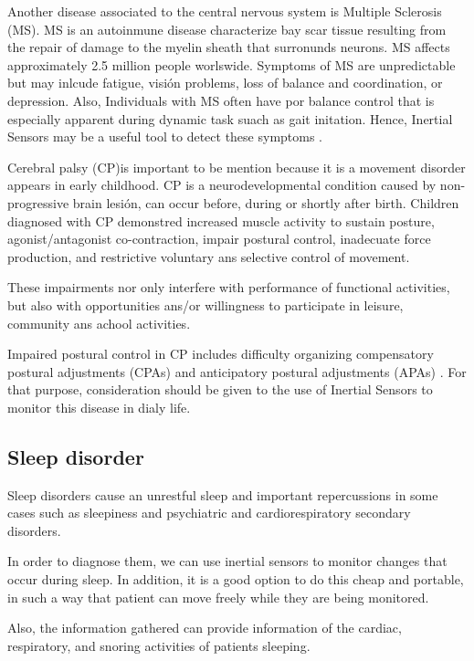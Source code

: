Another disease associated to the central nervous system is Multiple Sclerosis (MS). MS is an autoinmune disease characterize bay scar tissue resulting from the repair of damage to the myelin sheath that surronunds neurons. MS affects approximately 2.5 million people worlswide. Symptoms of MS are unpredictable but may inlcude fatigue, visión problems, loss of balance and coordination, or depression. Also, Individuals with MS often have por balance control that is especially apparent during dynamic task suach as gait initation. Hence, Inertial Sensors may be a useful tool to detect these symptoms \cite{Jebb2008}.


Cerebral  palsy (CP)is important to be mention  because it is a movement disorder appears in early childhood. CP is a neurodevelopmental condition caused by non-progressive brain lesión, can occur before, during or shortly after birth. Children diagnosed with CP demonstred increased muscle activity to sustain posture, agonist/antagonist co-contraction, impair postural control, inadecuate force production, and restrictive voluntary ans selective control of movement\cite{Gay2011}.

These impairments nor only interfere with performance of functional activities, but also with opportunities  ans/or willingness to participate in leisure, community ans achool activities.

Impaired postural control in CP includes difficulty organizing compensatory postural adjustments (CPAs) and anticipatory postural adjustments (APAs) \cite{Gay2011}. For that purpose,  consideration should be given to the use of Inertial Sensors to monitor this disease in dialy life.

\subsection{Sleep disorder}
Sleep disorders cause an unrestful sleep and important repercussions in some cases such as sleepiness and psychiatric and cardiorespiratory secondary disorders\cite{SanchezDaniel}. 

In order to diagnose them, we can use inertial sensors to monitor changes that occur during sleep. In addition, it is a good option to do this  cheap and portable, in such a way that patient can move freely while they are being monitored\cite{A.Olivares}.

Also, the information gathered can provide information  of the cardiac, respiratory, and snoring activities of patients sleeping\cite{SanchezDaniel}.

